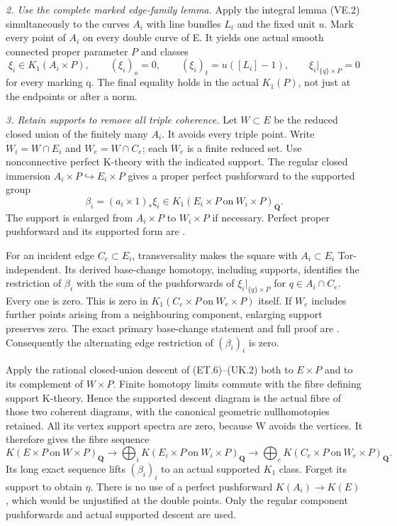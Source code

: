 \emph{2. Use the complete marked edge-family lemma.}
Apply the integral lemma (VE.2) simultaneously to the curves $A_i$
with line bundles $L_i$ and the fixed unit $u$. Mark every point
of $A_i$ on every double curve of E. It yields one actual smooth
connected proper parameter $P$ and classes
\[
 \xi_i\in K_1(A_i\times P),\qquad
  (\xi_i)_o=0,\qquad(\xi_i)_t=u([L_i]-1),
 \qquad \xi_i|_{\{q\}\times P}=0
\]
for every marking q. The final equality holds in the actual
$K_1(P)$, not just at the endpoints or after a norm.

\emph{3. Retain supports to remove all triple coherence.}
Let $W\subset E$ be the reduced closed union of the finitely many
$A_i$. It avoids every triple point. Write $W_i=W\cap E_i$ and
$W_e=W\cap C_e$; each $W_e$ is a finite reduced set.
Use nonconnective perfect K-theory with the indicated support.
The regular closed immersion $A_i\times P\hookrightarrow E_i\times P$
gives a proper perfect pushforward to the supported group
\[
 \beta_i=(a_i\times1)_*\xi_i
       \in K_1(E_i\times P\ \mathrm{on}\ W_i\times P)_{\mathbf Q}.
\]
The support is enlarged from $A_i\times P$ to $W_i\times P$ if
necessary. Perfect proper pushforward and its supported form are
\citet[Sections 3.16.4--3.16.7]{D_ThomasonTrobaugh1990}.

For an incident edge $C_e\subset E_i$, transversality makes the
square with $A_i\subset E_i$ Tor-independent. Its derived base-change
homotopy, including supports, identifies the restriction of $\beta_i$
with the sum of the pushforwards of
$\xi_i|_{\{q\}\times P}$ for $q\in A_i\cap C_e$.
Every one is zero. This is zero in
$K_1(C_e\times P\ \mathrm{on}\ W_e\times P)$ itself.
If $W_e$ includes further points arising from a neighbouring
component, enlarging support preserves zero. The exact primary
base-change statement and full proof are
\citet[Proposition 3.18, pp.~321--322]{D_ThomasonTrobaugh1990}.
Consequently the alternating edge restriction of $(\beta_i)_i$ is zero.

Apply the rational closed-union descent of (ET.6)--(UK.2) both to
$E\times P$ and to its complement of $W\times P$.
Finite homotopy limits commute with the fibre defining support
K-theory. Hence the supported descent diagram is the actual fibre
of those two coherent diagrams, with the canonical geometric
nullhomotopies retained. All its vertex support spectra are zero,
because W avoids the vertices. It therefore gives the fibre sequence
\begin{equation}
 K(E\times P\ \mathrm{on}\ W\times P)_{\mathbf Q}
 \longrightarrow
 \bigoplus_iK(E_i\times P\ \mathrm{on}\ W_i\times P)_{\mathbf Q}
 \longrightarrow
 \bigoplus_eK(C_e\times P\ \mathrm{on}\ W_e\times P)_{\mathbf Q}.
                                                        \tag{HK.3}
\end{equation}
Its long exact sequence lifts $(\beta_i)_i$ to an actual supported
$K_1$ class. Forget its support to obtain $\eta$.
There is no use of a perfect pushforward $K(A_i)\to K(E)$, which
would be unjustified at the double points. Only the regular component
pushforwards and actual supported descent are used.

